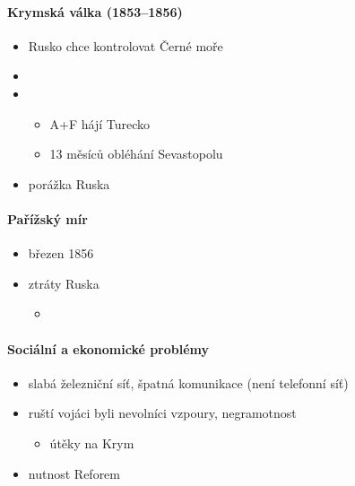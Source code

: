 \paragraph{Krymská válka (1853--1856)}
\begin{itemize}
\item Rusko chce kontrolovat Černé moře
\item {}
\item {}
	\begin{itemize}
	\item A+F hájí Turecko
	\item 13 měsíců obléhání Sevastopolu
	\end{itemize}
\item porážka Ruska
\end{itemize}

\paragraph{Pařížský mír}
\begin{itemize}
\item březen 1856
\item ztráty Ruska
	\begin{itemize}
	\item 
	\end{itemize}
\end{itemize}

\paragraph{Sociální a ekonomické problémy}
\begin{itemize}
\item slabá železniční síť, špatná komunikace (není telefonní síť)
\item ruští vojáci byli nevolníci \ra vzpoury, negramotnost
	\begin{itemize}
	\item útěky na Krym
	\end{itemize}
\item[\ra] nutnost Reforem
\end{itemize}


